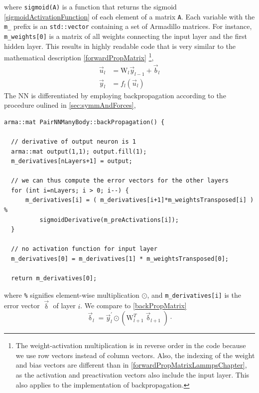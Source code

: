 \documentclass[twoside,english]{uiofysmaster}
\begin{document}
where \texttt{sigmoid(A)} is a function that returns the sigmoid \eqref{sigmoidActivationFunction} 
of each element of a matrix \texttt{A}. 
Each variable with the \texttt{m\_} prefix is an \texttt{std::vector} containing a set of Armadillo matrices. 
For instance, \texttt{m\_weights[0]} is a matrix of all weights connecting the input layer 
and the first hidden layer. This results in highly readable code that is very similar to the mathematical 
description \eqref{forwardPropMatrix} %
\footnote{The weight-activation multiplication is in reverse order in the code because we use row vectors instead of column vectors.
Also, the indexing of the weight and bias vectors are different than in \eqref{forwardPropMatrixLammpsChapter}, as 
the activation and preactivation vectors also include the input layer. This also applies to the implementation
of backpropagation.},
\begin{equation}
 \begin{aligned}
  \vec{u}_l &= \mathrm{W}_l\vec{y}_{l-1} + \vec{b}_l \\
  \vec{y}_l &= f_l(\vec{u}_l)
  \label{forwardPropMatrixLammpsChapter}
\end{aligned}
\end{equation}
The NN is differentiated by employing backpropagation according to the procedure oulined in \autoref{sec:symmAndForces},
\begin{verbatim}
arma::mat PairNNManyBody::backPropagation() {

  // derivative of output neuron is 1
  arma::mat output(1,1); output.fill(1);
  m_derivatives[nLayers+1] = output;

  // we can thus compute the error vectors for the other layers
  for (int i=nLayers; i > 0; i--) {
      m_derivatives[i] = ( m_derivatives[i+1]*m_weightsTransposed[i] ) %
          sigmoidDerivative(m_preActivations[i]);
  }

  // no activation function for input layer
  m_derivatives[0] = m_derivatives[1] * m_weightsTransposed[0];

  return m_derivatives[0];
\end{verbatim}
where \texttt{\%} signifies element-wise multiplication $\odot$,
and \texttt{m\_derivatives[i]} is the error vector $\vec{\updelta}$ of layer $i$. 
We compare to \eqref{backPropMatrix}%
\begin{equation}
 \vec{\updelta}_l = \vec{y}^\prime_l \odot (\mathrm{W}^T_{l+1}\vec{\updelta}_{l+1}) \cdot 
 \label{backPropMatrixLammpsChapter}
\end{equation}
\end{document}
